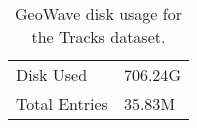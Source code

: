 \begin{table}[htb]
  \centering
  \begin{tabular}{ | l | l | }
    \hline
    Disk Used & $706.24$G \\
    Total Entries & $35.83$M \\
    \hline
  \end{tabular}
  \caption{GeoWave disk usage for the Tracks dataset.}
  \label{table:tracks:geowave:disk}
\end{table}



